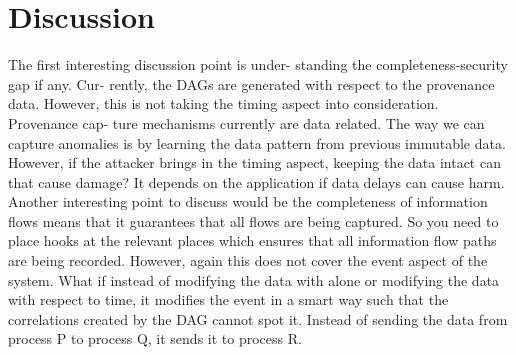 \section{Discussion}
The first interesting discussion point is under-
standing the completeness-security gap if any. Cur-
rently, the DAGs are generated with respect to the
provenance data. However, this is not taking the
timing aspect into consideration. Provenance cap-
ture mechanisms currently are data related. The way
we can capture anomalies is by learning the data
pattern from previous immutable data. However, if
the attacker brings in the timing aspect, keeping the
data intact can that cause damage? It depends on
the application if data delays can cause harm.
Another interesting point to discuss would be the
completeness of information flows means that it
guarantees that all flows are being captured. So
you need to place hooks at the relevant places
which ensures that all information flow paths are
being recorded. However, again this does not cover
the event aspect of the system. What if instead of
modifying the data with alone or modifying the data
with respect to time, it modifies the event in a smart
way such that the correlations created by the DAG
cannot spot it. Instead of sending the data from
process P to process Q, it sends it to process R.